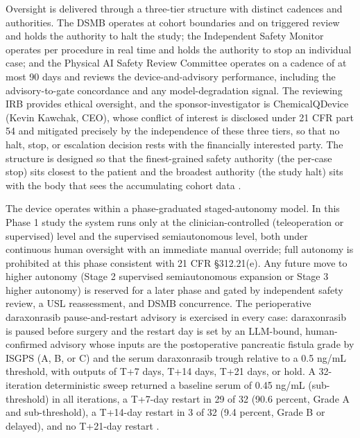 Oversight is delivered through a three-tier structure with distinct cadences and
authorities. The DSMB operates at cohort boundaries and on triggered review and holds
the authority to halt the study; the Independent Safety Monitor operates per
procedure in real time and holds the authority to stop an individual case; and the
Physical AI Safety Review Committee operates on a cadence of at most 90 days and
reviews the device-and-advisory performance, including the advisory-to-gate
concordance and any model-degradation signal. The reviewing IRB provides ethical
oversight, and the sponsor-investigator is ChemicalQDevice (Kevin Kawchak, CEO),
whose conflict of interest is disclosed under 21 CFR part 54 and mitigated precisely
by the independence of these three tiers, so that no halt, stop, or escalation
decision rests with the financially interested party. The structure is designed so
that the finest-grained safety authority (the per-case stop) sits closest to the
patient and the broadest authority (the study halt) sits with the body that sees the
accumulating cohort data \cite{daraxwhipple,clintrustpai,paiautospons}.

The device operates within a phase-graduated staged-autonomy model. In this Phase 1
study the system runs only at the clinician-controlled (teleoperation or supervised)
level and the supervised semiautonomous level, both under continuous human oversight
with an immediate manual override; full autonomy is prohibited at this phase
consistent with 21 CFR \S 312.21(e). Any future move to higher autonomy (Stage 2
supervised semiautonomous expansion or Stage 3 higher autonomy) is reserved for a
later phase and gated by independent safety review, a USL reassessment, and DSMB
concurrence. The perioperative daraxonrasib pause-and-restart advisory is exercised
in every case: daraxonrasib is paused before surgery and the restart day is set by
an LLM-bound, human-confirmed advisory whose inputs are the postoperative pancreatic
fistula grade by ISGPS (A, B, or C) and the serum daraxonrasib trough relative to a
0.5 ng/mL threshold, with outputs of T+7 days, T+14 days, T+21 days, or hold. A
32-iteration deterministic sweep returned a baseline serum of 0.45 ng/mL
(sub-threshold) in all iterations, a T+7-day restart in 29 of 32 (90.6 percent,
Grade A and sub-threshold), a T+14-day restart in 3 of 32 (9.4 percent, Grade B or
delayed), and no T+21-day restart \cite{daraxwhipple,clintrustpai}.

